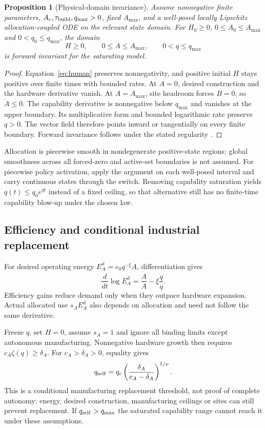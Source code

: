 \documentclass[12pt,a4paper]{article}
\newtheorem{proposition}{Proposition}[section]
\theoremstyle{remark}
\begin{document}
\begin{proposition}[Physical-domain invariance]\label{prop:domain}
Assume nonnegative finite parameters, $A_c,\tau_{\rm build},q_{\max}>0$, fixed $A_{\max}$, and a well-posed locally Lipschitz allocation-coupled ODE on the relevant state domain. For $H_0\ge0$, $0\le A_0\le A_{\max}$ and $0<q_0\le q_{\max}$, the domain
\[
H\ge0,\qquad 0\le A\le A_{\max},\qquad 0<q\le q_{\max}
\]
is forward invariant for the saturating model.
\end{proposition}
\begin{proof}
Equation~\eqref{eq:human} preserves nonnegativity, and positive initial $H$ stays positive over finite times with bounded rates. At $A=0$, desired construction and the hardware derivative vanish. At $A=A_{\max}$, site headroom forces $B=0$, so $\dot A\le0$. The capability derivative is nonnegative below $q_{\max}$ and vanishes at the upper boundary. Its multiplicative form and bounded logarithmic rate preserve $q>0$. The vector field therefore points inward or tangentially on every finite boundary. Forward invariance follows under the stated regularity \cite{aubin}.
\end{proof}
Allocation is piecewise smooth in nondegenerate positive-state regions; global smoothness across all forced-zero and active-set boundaries is not assumed. For piecewise policy activation, apply the argument on each well-posed interval and carry continuous states through the switch. Removing capability saturation yields $q(t)\le q_0e^{\eta t}$ instead of a fixed ceiling, so that alternative still has no finite-time capability blow-up under the chosen law.

\subsection{Efficiency and conditional industrial replacement}
For desired operating energy $E_A^d=e_0q^{-\xi}A$, differentiation gives
\begin{equation}\label{eq:efficiency}
\frac{d}{dt}\log E_A^d=\frac{\dot A}{A}-\xi\frac{\dot q}{q}.
\end{equation}
Efficiency gains reduce demand only when they outpace hardware expansion. Actual allocated use $s_AE_A^d$ also depends on allocation and need not follow the same derivative.

Freeze $q$, set $H=0$, assume $s_A=1$ and ignore all binding limits except autonomous manufacturing. Nonnegative hardware growth then requires $c_A\zeta(q)\ge\delta_A$. For $c_A>\delta_A>0$, equality gives
\begin{equation}\label{eq:self}
q_{\rm self}=q_c\left(\frac{\delta_A}{c_A-\delta_A}\right)^{1/\nu}.
\end{equation}
This is a conditional manufacturing replacement threshold, not proof of complete autonomy: energy, desired construction, manufacturing ceilings or sites can still prevent replacement. If $q_{\rm self}>q_{\max}$ the saturated capability range cannot reach it under these assumptions.
\end{document}
